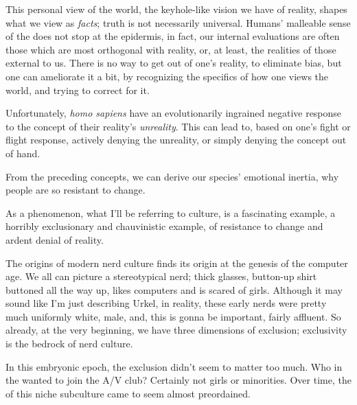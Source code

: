 \documentclass[../butidigress.tex]{subfiles}
\begin{document}
This personal view of the world, the keyhole-like vision we have of reality, shapes what we view as \emph{facts}; truth is not necessarily universal.
Humans' malleable sense of the  does not stop at the epidermis, in fact, our internal evaluations are often those which are most orthogonal with reality, or, at least, the realities of those external to us.
There is no way to get out of one's reality, to eliminate bias, but one can ameliorate it a bit, by recognizing the specifics of how one views the world, and trying to correct for it.

Unfortunately, \textit{homo sapiens} have an evolutionarily ingrained negative response to the concept of their reality's \emph{unreality}.
This can lead to, based on one's fight or flight response, actively denying the unreality, or simply denying the concept out of hand.

From the preceding concepts, we can derive our species' emotional inertia, why people are so resistant to change.

As a phenomenon, what I'll be referring to  culture, is a fascinating example, a horribly exclusionary and chauvinistic example, of resistance to change and ardent denial of reality.

\entryskip


\entryskip

The origins of modern nerd culture finds its origin at the genesis of the computer age.
We all can picture a stereotypical nerd; thick glasses, button-up shirt buttoned all the way up, likes computers and is scared of girls.
Although it may sound like I'm just describing Urkel, in reality, these early nerds were pretty much uniformly white, male, and, this is gonna be important, fairly affluent.
So already, at the very beginning, we have three dimensions of exclusion; exclusivity is the bedrock of nerd culture.

In this embryonic epoch, the exclusion didn't seem to matter too much.
Who in the  wanted to join the A/V club?
Certainly not girls or minorities.
Over time, the  of this niche subculture came to seem almost preordained.
\end{document}
